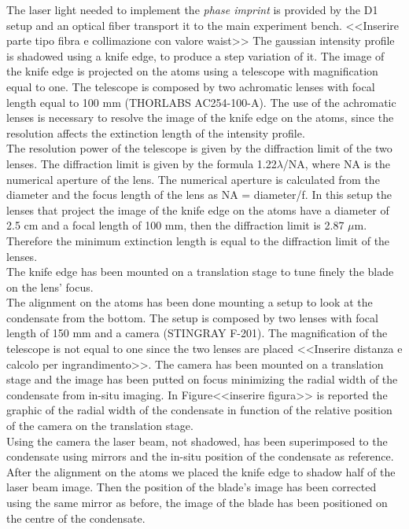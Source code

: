 \documentclass[../thesis.tex]{subfiles}
\begin{document}
The laser light needed to implement the \textit{phase imprint} is provided by the D1 setup and an optical fiber transport it to the main experiment bench. <<Inserire parte tipo fibra e collimazione con valore waist>> The gaussian intensity profile is shadowed using a knife edge, to produce a step variation of it. The image of the knife edge is projected on the atoms using a telescope with magnification equal to one. The telescope is composed by two achromatic lenses with focal length equal to 100 mm (THORLABS AC254-100-A). The use of the achromatic lenses is necessary to resolve the image of the knife edge on the atoms, since the resolution affects the extinction length of the intensity profile.\\
The resolution power of the telescope is given by the diffraction limit of the two lenses. The diffraction limit is given by the formula 1.22$\lambda$/NA, where NA is the numerical aperture of the lens. The numerical aperture is calculated from the diameter and the focus length of the lens as NA = diameter/f. In this setup the lenses that project the image of the knife edge on the atoms have a diameter of 2.5 cm and a focal length of 100 mm, then the diffraction limit is 2.87 $\mu$m. Therefore the minimum extinction length is equal to the diffraction limit of the lenses.\\
The knife edge has been mounted on a translation stage to tune finely the blade on the lens' focus.\\

The alignment on the atoms has been done mounting a setup to look at the condensate from the bottom. The setup is composed by two lenses with focal length of 150 mm and a camera (STINGRAY F-201). The magnification of the telescope is not equal to one since the two lenses are placed <<Inserire distanza e calcolo per ingrandimento>>. The camera has been mounted on a translation stage and the image has been putted on focus minimizing the radial width of the condensate from in-situ imaging. In Figure<<inserire figura>> is reported the graphic of the radial width of the condensate in function of the relative position of the camera on the translation stage.\\

Using the camera the laser beam, not shadowed, has been superimposed to the condensate using mirrors and the in-situ position of the condensate as reference. After the alignment on the atoms we placed the knife edge to shadow half of the laser beam image. Then the position of the blade's image has been corrected using the same mirror as before, the image of the blade has been positioned on the centre of the condensate.\\
\end{document}
